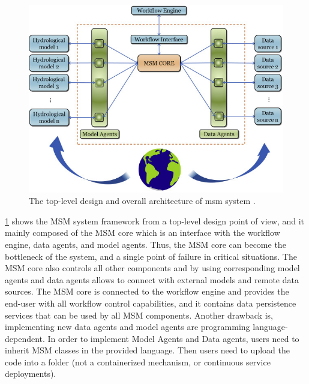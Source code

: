 \begin{figure}[htp]
    \centering
    \includegraphics[width=1\textwidth]{lit/other/msm_architecture.jpg}
    \caption[The top-level design and overall architecture of \acrshort{msm} system]{The top-level design and overall architecture of \acrshort{msm} system \cite{Salas2020AnApplication}.}
    \label{fi:msm_architecture}
\end{figure}

\cref{fi:msm_architecture} shows the MSM system framework from a top-level design point of view, and it mainly composed of the MSM core which is an interface with the workflow engine, data agents, and model agents. Thus, the MSM core can become the bottleneck of the system, and a single point of failure in critical situations. The MSM core also controls all other components and by using corresponding model agents and data agents allows to connect with external models and remote data sources. The MSM core is connected to the workflow engine and provides the end-user with all workflow control capabilities, and it contains data persistence services that can be used by all MSM components. Another drawback is, implementing new data agents and model agents are programming language-dependent. In order to implement Model Agents and Data agents, users need to inherit MSM classes in the provided language. Then users need to upload the code into a folder (not a containerized mechanism, or continuous service deployments).

